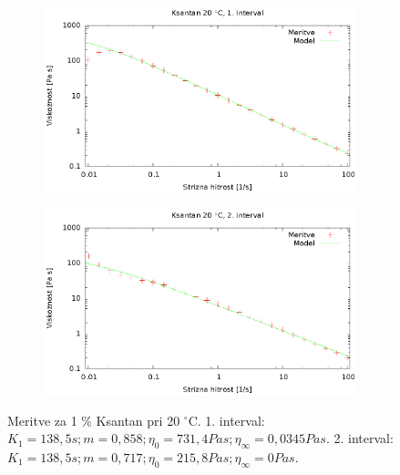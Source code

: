 \documentclass{article}
\begin{document}
\begin{figure}
	\centering
	\begin{subfigure}[b]{0.4\textwidth}
	       \includegraphics[width=\textwidth]{cross_ksan1.eps}
	   \end{subfigure}
	   \begin{subfigure}[b]{0.4\textwidth}
	       \includegraphics[width=\textwidth]{cross_ksan2.eps}
	   \end{subfigure}
	\caption{Meritve za 1 \% Ksantan pri 20 $^\circ$C. 1. interval: $K_1 = 138,5 s; m = 0,858; \eta_0 = 731,4 Pa s; \eta_\infty = 0,0345 Pa s$. 2. interval: $K_1 = 138,5 s; m = 0,717; \eta_0 = 215,8 Pa s; \eta_\infty = 0 Pa s$.}
	\label{fig:cross_xan1}
\end{figure}
\end{document}
